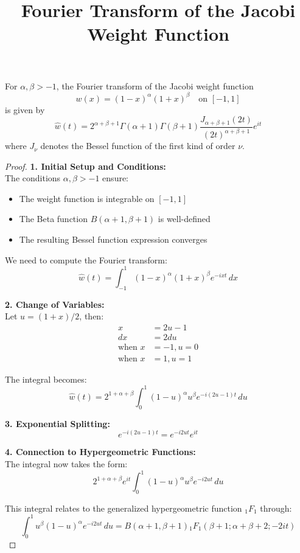 \documentclass{article}
\title{Fourier Transform of the Jacobi Weight Function}
\author{}
\date{}
\begin{document}
\maketitle

\begin{theorem}
For $\alpha, \beta > -1$, the Fourier transform of the Jacobi weight function
\[ w(x) = (1-x)^\alpha(1+x)^\beta \quad \text{on } [-1,1] \]
is given by
\[ \hat{w}(t) = 2^{\alpha+\beta+1} \Gamma(\alpha+1) \Gamma(\beta+1) \frac{J_{\alpha+\beta+1}(2t)}{(2t)^{\alpha+\beta+1}} e^{it} \]
where $J_\nu$ denotes the Bessel function of the first kind of order $\nu$.
\end{theorem}

\begin{proof}
\textbf{1. Initial Setup and Conditions:}\\
The conditions $\alpha, \beta > -1$ ensure:
\begin{itemize}
\item The weight function is integrable on $[-1,1]$
\item The Beta function $B(\alpha+1,\beta+1)$ is well-defined
\item The resulting Bessel function expression converges
\end{itemize}

We need to compute the Fourier transform:
\[ \hat{w}(t) = \int_{-1}^1 (1-x)^\alpha (1+x)^\beta e^{-ixt} \, dx \]

\textbf{2. Change of Variables:}\\
Let $u = (1+x)/2$, then:
\begin{align*}
x &= 2u-1 \\
dx &= 2du \\
\text{when } x &= -1, u = 0 \\
\text{when } x &= 1, u = 1
\end{align*}

The integral becomes:
\[ \hat{w}(t) = 2^{1+\alpha+\beta} \int_0^1 (1-u)^\alpha u^\beta e^{-i(2u-1)t} \, du \]

\textbf{3. Exponential Splitting:}
\[ e^{-i(2u-1)t} = e^{-i2ut} e^{it} \]

\textbf{4. Connection to Hypergeometric Functions:}\\
The integral now takes the form:
\[ 2^{1+\alpha+\beta} e^{it} \int_0^1 (1-u)^\alpha u^\beta e^{-i2ut} \, du \]

This integral relates to the generalized hypergeometric function $_1F_1$ through:
\[ \int_0^1 u^\beta (1-u)^\alpha e^{-i2ut} \, du = B(\alpha+1,\beta+1) {}_1F_1(\beta+1;\alpha+\beta+2;-2it) \]


\end{proof}
\end{document}
